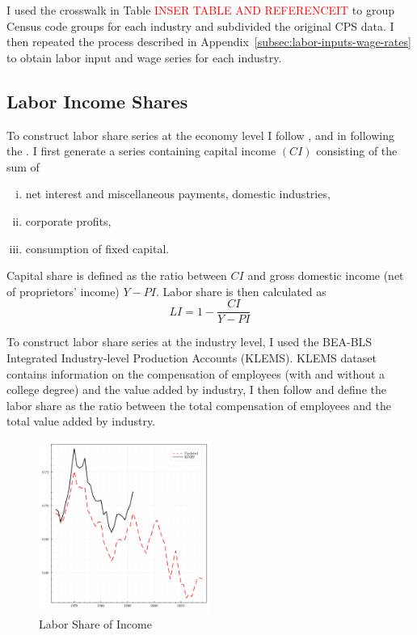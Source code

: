 \documentclass[12pt]{article}
\begin{document}
I used the crosswalk in Table \textcolor{red}{INSER TABLE AND REFERENCEIT} to group Census code groups for each industry and subdivided the original CPS data. I then repeated the process described in Appendix~\ref{subsec:labor-inputs-wage-rates} to obtain labor input and wage series for each industry.


\subsection{Labor Income Shares}\label{sec:labor_share_income}
To construct labor share series at the economy level I follow \citet{krusell2000capital}, \citet{castex2022decline} and \citet{ohanian2021revisiting} in following the \citet*{cooley1995frontiers}. I first generate a series containing capital income $(CI)$ consisting of the sum of 
\begin{enumerate}[(i)]
 \item net interest and miscellaneous payments, domestic industries,
 \item corporate profits,
 \item consumption of fixed capital.
\end{enumerate}
Capital share is defined as the ratio between $CI$ and gross domestic income (net of proprietors' income) $Y - PI$. Labor share is then calculated as 
\begin{equation*}
 LI = 1 - \frac{CI}{Y - PI}
\end{equation*}

To construct labor share series at the industry level, I used the BEA-BLS Integrated Industry-level Production Accounts (KLEMS). KLEMS dataset contains information on the compensation of employees (with and without a college degree) and the value added by industry, I then follow \citep{karabarbounis2014global} and define the labor share as the ratio between the total compensation of employees and the total value added by industry.

\begin{figure}[H]
\centering
\includegraphics[width=0.5\textwidth]{../images/fig:labor_share_updated.pdf}
\caption*{\label{fig:labor_share_updated} Labor Share of Income}
\end{figure}
\end{document}
